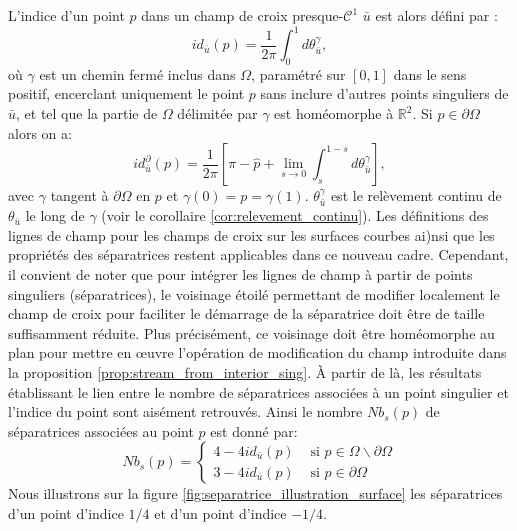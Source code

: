 L'indice d'un point $p$ dans un champ de croix presque-$\mathcal{C}^1$ $\bar{u}$ est alors défini par :
\begin{equation}
\label{eqn:index_surf}
id_{\bar{u}}(p) = \frac{1}{2\pi}\int_0^1 d\theta_{\bar{u}}^\gamma,
\end{equation}
où $\gamma$ est un chemin fermé inclus dans $\Omega$, paramétré sur $[0, 1]$ dans le sens positif, encerclant uniquement le point $p$ sans inclure d'autres points singuliers de $\bar{u}$, et tel que la partie de $\Omega$ délimitée par $\gamma$ est homéomorphe à $\mathbb{R}^2$. Si $p\in\partial\Omega$ alors on a:
\begin{equation}
id^\partial_{\bar{u}}(p) = \frac{1}{2\pi}\left[\pi-\hat{p}+\lim\limits_{s\rightarrow 0}\int_s^{1-s}d\theta_{\bar{u}}^\gamma\right],
\end{equation}
avec $\gamma$ tangent à $\partial\Omega$ en $p$ et $\gamma(0)=p=\gamma(1)$. $\theta_{\bar{u}}^\gamma$ est le relèvement continu de $\theta_{\bar{u}}$ le long de $\gamma$ (voir le corollaire \ref{cor:relevement_continu}). Les définitions des lignes de champ pour les champs de croix sur les surfaces courbes ai)nsi que les propriétés des séparatrices restent applicables dans ce nouveau cadre. Cependant, il convient de noter que pour intégrer les lignes de champ à partir de points singuliers (séparatrices), le voisinage étoilé permettant de modifier localement le champ de croix pour faciliter le démarrage de la séparatrice doit être de taille suffisamment réduite. Plus précisément, ce voisinage doit être homéomorphe au plan pour mettre en œuvre l'opération de modification du champ introduite dans la proposition \ref{prop:stream_from_interior_sing}. À partir de là, les résultats établissant le lien entre le nombre de séparatrices associées à un point singulier et l'indice du point sont aisément retrouvés. Ainsi le nombre $Nb_s(p)$ de séparatrices associées au point $p$ est donné par:
\begin{equation}
    Nb_s(p) =
    \left\{
    \begin{array}{ll}
    4-4id_{\bar{u}}(p) & \mbox{ si } p\in\Omega\backslash\partial\Omega\\[0.3cm]
    3-4id_{\bar{u}}(p) & \mbox{ si } p\in\partial\Omega
    \end{array}
    \right.
\end{equation}
Nous illustrons sur la figure \ref{fig:separatrice_illustration_surface} les séparatrices d'un point d'indice $1/4$ et d'un point d'indice $-1/4$.

